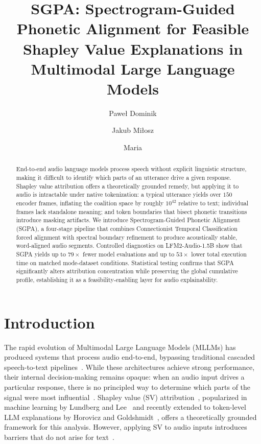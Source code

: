 \documentclass[cameraready]{Interspeech}
\title{SGPA: Spectrogram-Guided Phonetic Alignment for Feasible Shapley Value Explanations in Multimodal Large Language Models}
\author[affiliation={1}, orcid=0009-0007-0728-1043, equalcontribution, correspondingauthor]{Paweł Dominik}{Pozorski}
\author[affiliation={1}, orcid=0009-0000-2797-6044, equalcontribution, correspondingauthor]{Jakub Miłosz}{Muszyński}
\author[affiliation={1}, orcid=0000-0001-7714-4844]{Maria}{Ganzha}
\begin{document}
\maketitle

\begin{abstract}
  End-to-end audio language models process speech without explicit linguistic structure, making it difficult to identify which parts of an utterance drive a given response. Shapley value attribution offers a theoretically grounded remedy, but applying it to audio is intractable under native tokenization: a typical utterance yields over $150$ encoder frames, inflating the coalition space by roughly $10^{42}$ relative to text; individual frames lack standalone meaning; and token boundaries that bisect phonetic transitions introduce masking artifacts. We introduce Spectrogram-Guided Phonetic Alignment (SGPA), a four-stage pipeline that combines Connectionist Temporal Classification forced alignment with spectral boundary refinement to produce acoustically stable, word-aligned audio segments. Controlled diagnostics on LFM2-Audio-1.5B show that SGPA yields up to $79\times$ fewer model evaluations and up to $53\times$ lower total execution time on matched mode-dataset conditions. Statistical testing confirms that SGPA significantly alters attribution concentration while preserving the global cumulative profile, establishing it as a feasibility-enabling layer for audio explainability.
\end{abstract}

\section{Introduction}

The rapid evolution of Multimodal Large Language Models (MLLMs) has produced systems that process audio end-to-end, bypassing traditional cascaded speech-to-text pipelines~\cite{yang2025largelanguagemodelsmeet, Lee_2022}. While these architectures achieve strong performance, their internal decision-making remains opaque: when an audio input drives a particular response, there is no principled way to determine which parts of the signal were most influential~\cite{zhao2023explainabilitylargelanguagemodels}. Shapley value (SV) attribution~\cite{RM-670-PR}, popularized in machine learning by Lundberg and Lee~\cite{lundberg2017unifiedapproachinterpretingmodel} and recently extended to token-level LLM explanations by Horovicz and Goldshmidt~\cite{goldshmidt2024tokenshapinterpretinglargelanguage}, offers a theoretically grounded framework for this analysis. However, applying SV to audio inputs introduces barriers that do not arise for text~\cite{arrieta2020explainable}.
\end{document}
